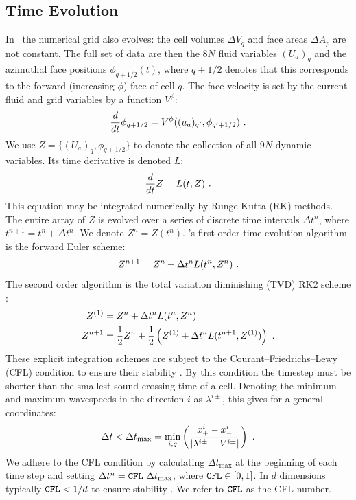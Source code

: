 \subsection{Time Evolution}
In \grdisco\ the numerical grid also evolves: the cell volumes $\Delta V_q$ and face areas $\Delta A_p$ are not constant.  The full set of data are then the $8N$ fluid variables $(U_a)_q$ and the azimuthal face positions $\phi_{q+1/2}(t)$, where $q+1/2$ denotes that this corresponds to the forward (increasing $\phi$) face of cell $q$.  The face velocity is set by the current fluid and grid variables by a function $V^\phi$:
\begin{equation}
	\frac{d}{dt} \phi_{q+1/2} = V^\phi((u_a)_{q'}, \phi_{q'+1/2}) \ . \eqlabel{faceMovement} 
\end{equation}
We use $Z = \{ (U_a)_q, \phi_{q+1/2} \}$ to denote the collection of all $9N$ dynamic variables.  Its time derivative is denoted $L$:
\begin{equation}
	\frac{d}{dt} Z = L(t, Z)\ . \eqlabel{Zevol}
\end{equation}
This equation may be integrated numerically by Runge-Kutta (RK) methods.  The entire array of $Z$ is evolved over a series of discrete time intervals $\Delta t^n$, where $t^{n+1} = t^n + \Delta t^n$. We denote $Z^n = Z(t^n)$.  \grdisco's first order time evolution algorithm is the forward Euler scheme:
\begin{equation}
	Z^{n+1} = Z^n + \Delta t^n L(t^n, Z^n) \ . \eqlabel{fe}
\end{equation}
The second order algorithm is the total variation diminishing (TVD) RK2 scheme \citep{Gottlieb98}:
\begin{align}
	Z^{(1)} &= Z^n + \Delta t^n L(t^n, Z^n) \\
	Z^{n+1} &= \frac{1}{2}Z^n + \frac{1}{2}\left(Z^{(1)} + \Delta t^n L(t^{n+1}, Z^{(1)}) \right) \ . \eqlabel{rk2}
\end{align}
These explicit integration schemes are subject to the Courant--Friedrichs--Lewy (CFL) condition to ensure their stability \citep{CFL28}.  By this condition the timestep must be shorter than the smallest sound crossing time of a cell.  Denoting the minimum and maximum wavespeeds in the direction $i$ as $\lambda^{i\pm}$, this gives for a general coordinates:
\begin{equation}
	\Delta t < \Delta t_{\mathrm{max}} = \underset{i,q}{\min}\left( \frac{x^i_+ - x^i_-}{\left |\lambda^{i\pm} - V^{i\pm}\right |} \right)\ . \eqlabel{CFL}
\end{equation}
We adhere to the CFL condition by calculating $\Delta t_{\mathrm{max}}$ at the beginning of each time step and setting $\Delta t^n = \mathtt{CFL}\ \Delta t_{\mathrm{max}}$, where $\mathtt{CFL} \in [0,1]$.  In $d$ dimensions typically $\mathtt{CFL} < 1/d$ to ensure stability \cite{Toro}.  We refer to $\mathtt{CFL}$ as the CFL number.

